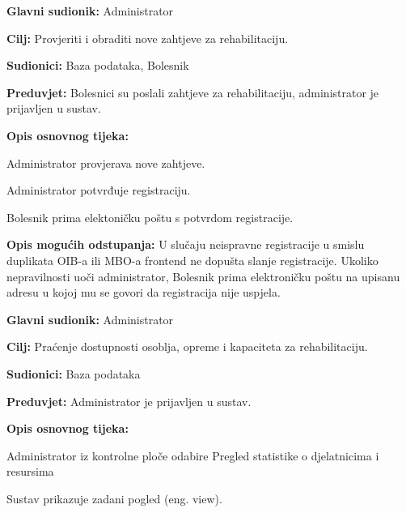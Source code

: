 	\item \textbf{Glavni sudionik:} Administrator
	\item \textbf{Cilj:} Provjeriti i obraditi nove zahtjeve za rehabilitaciju.
	\item \textbf{Sudionici:} Baza podataka, Bolesnik
	\item \textbf{Preduvjet:} Bolesnici su poslali zahtjeve za rehabilitaciju, administrator je prijavljen u sustav.
	\item \textbf{Opis osnovnog tijeka:}
	\begin{packed_enum}
		\item Administrator provjerava nove zahtjeve.
		\item Administrator potvrđuje registraciju.
		\item Bolesnik prima elektoničku poštu s potvrdom registracije.
	\end{packed_enum}
 \item \textbf{Opis mogućih odstupanja:}
	U slučaju neispravne registracije u smislu duplikata OIB-a ili MBO-a frontend ne dopušta slanje registracije. 
    Ukoliko nepravilnosti uoči administrator, Bolesnik prima elektroničku poštu na upisanu adresu u kojoj mu se govori da registracija nije uspjela. 
\closeusecase


	\item \textbf{Glavni sudionik:} Administrator 
	\item \textbf{Cilj:} Praćenje dostupnosti osoblja, opreme i kapaciteta za rehabilitaciju.
	\item \textbf{Sudionici:} Baza podataka
	\item \textbf{Preduvjet:} Administrator je prijavljen u sustav.
	\item \textbf{Opis osnovnog tijeka:}
	\begin{packed_enum}
		\item Administrator iz kontrolne ploče odabire Pregled statistike o djelatnicima i resursima
		\item Sustav prikazuje zadani pogled (eng. view). 
	\end{packed_enum}
\closeusecase

